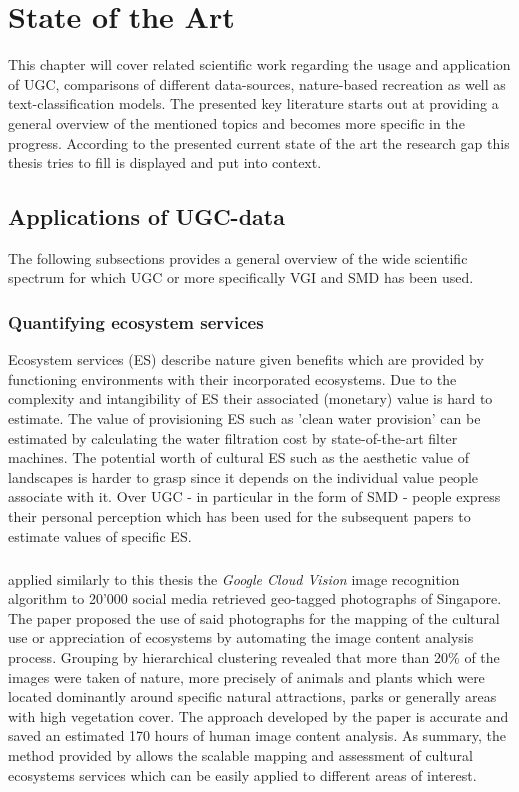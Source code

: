 \chapter{State of the Art} \label{state_of_the_art}
This chapter will cover related scientific work regarding the usage and application of UGC, comparisons of different data-sources, nature-based recreation as well as text-classification models. The presented key literature starts out at providing a general overview of the mentioned topics and becomes more specific in the progress. According to the presented current state of the art the research gap this thesis tries to fill is displayed and put into context.

\section{Applications of UGC-data}
The following subsections provides a general overview of the wide scientific spectrum for which UGC or more specifically VGI and SMD has been used.

\subsection{Quantifying ecosystem services}
Ecosystem services (ES) describe nature given benefits which are provided by functioning environments with their incorporated ecosystems. Due to the complexity and intangibility of ES their associated (monetary) value is hard to estimate. The value of provisioning ES such as 'clean water provision' can be estimated by calculating the water filtration cost by state-of-the-art filter machines. The potential worth of cultural ES such as the aesthetic value of landscapes is harder to grasp since it depends on the individual value people associate with it. Over UGC - in particular in the form of SMD - people express their personal perception which has been used for the subsequent papers to estimate values of specific ES.  

\paragraph*{\textcite{Richards2018}} applied similarly to this thesis the \textit{Google Cloud Vision} image recognition algorithm to 20'000 social media retrieved geo-tagged photographs of Singapore. The paper proposed the use of said photographs for the mapping of the cultural use or appreciation of ecosystems by automating the image content analysis process. Grouping by hierarchical clustering revealed that more than 20\% of the images were taken of nature, more precisely of animals and plants which were located dominantly around specific natural attractions, parks or generally areas with high vegetation cover. The approach developed by the paper is accurate and saved an estimated 170 hours of human image content analysis. As summary, the method provided by \textcite{Richards2018} allows the scalable mapping and assessment of cultural ecosystems services which can be easily applied to different areas of interest.

